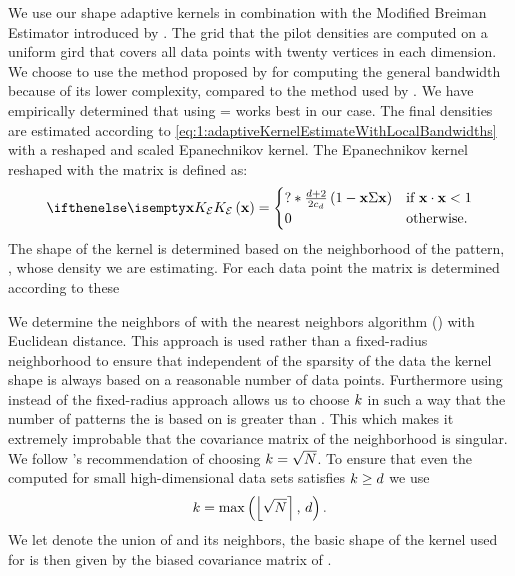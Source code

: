 
	We use our shape adaptive kernels in combination with the Modified Breiman Estimator introduced by \textcite{wilkinson1995dataplot}.
	The grid that the pilot densities are computed on a uniform gird that covers all data points with twenty vertices in each dimension.  
	We choose to use the method proposed by \textcite{ferdosi2011comparison} for computing the general bandwidth because of its lower complexity, compared to the method used by \textcite{wilkinson1995dataplot}. 
	We have empirically determined  that using \varMBESensitivityParam =  works best in our case. 
	The final densities are estimated according to \cref{eq:1:adaptiveKernelEstimateWithLocalBandwidths} with a reshaped and scaled Epanechnikov kernel. The Epanechnikov kernel reshaped with the matrix \varCovarianceMatrix is defined as:
	\begin{equation}\label{eq:1:epanechnikovKernelWithCovarianceMatrix}
		\varKernel[\varEpan]{\varPattern} = 
		\begin{cases}
			? * \frac{\varDim + 2}{2\varUnitSphere{\varDim}} \left( 1 - \varPattern \varCovarianceMatrix \varPattern \right) & \text{if } \varPattern \cdot \varPattern < 1\\
			0 & \text{otherwise.}
		\end{cases}
	\end{equation}
	The shape of the kernel is determined based on the neighborhood of the pattern, \varPattern, whose density we are estimating. For each data point \varPattern the matrix \varCovarianceMatrix is determined according to these 




	We determine the neighbors of \varPattern with the \KNNK nearest neighbors algorithm (\KNN) with Euclidean distance. This approach is used rather than a fixed-radius neighborhood to ensure that independent of the sparsity of the data the kernel shape is always based on a reasonable number of data points. 
	Furthermore using \KNN instead of the fixed-radius approach allows us to choose $k$ in such a way that the number of patterns the \varCovarianceMatrix is based on is greater than \varDim. This which makes it extremely improbable that the covariance matrix of the neighborhood is singular. We follow \citeauthor{silverman1986density}'s \cite{silverman1986density} recommendation of choosing $k = \sqrt{N}$. To ensure that even the \KNNK computed for small high-dimensional data sets satisfies $k \geq d$ we use
	\begin{equation*}
	k = \max\left(\left\lfloor \sqrt{N} \right\rceil,\, d \right).	
	\end{equation*}
	We let \varNeighborhood{\varPattern} denote the union of \varPattern and its \KNNK neighbors, the basic shape of the kernel used for \varPattern is then given by the biased covariance matrix of \varNeighborhood{\varPattern}.

